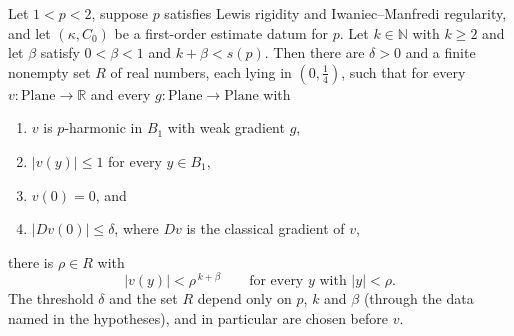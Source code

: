 \begin{lemma}
Let $1<p<2$, suppose $p$ satisfies Lewis rigidity and Iwaniec--Manfredi regularity, and let
$(\kappa,C_0)$ be a first-order estimate datum for $p$.  Let $k\in\mathbb{N}$ with $k\ge2$ and
let $\beta$ satisfy $0<\beta<1$ and $k+\beta<s(p)$.  Then there are $\delta>0$ and a finite
nonempty set $R$ of real numbers, each lying in $(0,\tfrac14)$, such that for every
$v\colon\mathrm{Plane}\to\mathbb{R}$ and every $g\colon\mathrm{Plane}\to\mathrm{Plane}$ with
\begin{enumerate}
\item $v$ is $p$-harmonic in $B_1$ with weak gradient $g$,
\item $\lvert v(y)\rvert\le1$ for every $y\in B_1$,
\item $v(0)=0$, and
\item $\lvert Dv(0)\rvert\le\delta$, where $Dv$ is the classical gradient of $v$,
\end{enumerate}
there is $\rho\in R$ with
\[
  \lvert v(y)\rvert<\rho^{\,k+\beta}\qquad\text{for every }y\text{ with }\lvert y\rvert<\rho .
\]
The threshold $\delta$ and the set $R$ depend only on $p$, $k$ and $\beta$ (through the data
named in the hypotheses), and in particular are chosen before $v$.
\end{lemma}
